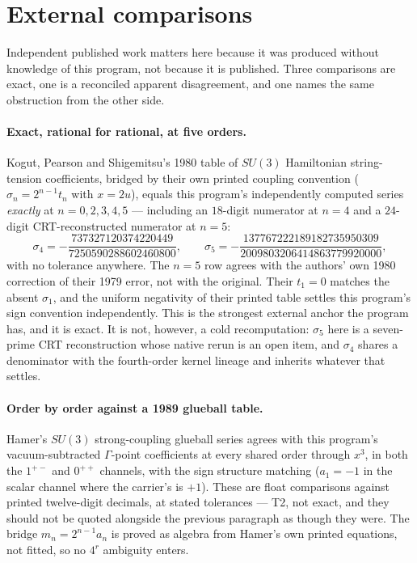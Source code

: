 \documentclass[11pt]{article}
\theoremstyle{definition}
\theoremstyle{remark}
\newcommand{\chk}[1]{}
\begin{document}
\section{External comparisons}\label{sec:external}

Independent published work matters here because it was produced without
knowledge of this program, not because it is published. Three comparisons are
exact, one is a reconciled apparent disagreement, and one names the same
obstruction from the other side.

\paragraph{Exact, rational for rational, at five orders.} Kogut, Pearson and
Shigemitsu's 1980 table of $SU(3)$ Hamiltonian string-tension coefficients,
bridged by their own printed coupling convention ($\sigma_n=2^{n-1}t_n$ with
$x=2u$), equals this program's independently computed series \emph{exactly} at
$n=0,2,3,4,5$ --- including an $18$-digit numerator at $n=4$ and a $24$-digit
CRT-reconstructed numerator at $n=5$:
\[
  \sigma_4=-\frac{737327120374220449}{7250590288602460800},\qquad
  \sigma_5=-\frac{137767222189182735950309}{2009803206414863779920000},
\]
with no tolerance anywhere. The $n=5$ row agrees with the authors' own 1980
correction of their 1979 error, not with the original. Their $t_1=0$ matches
the absent $\sigma_1$, and the uniform negativity of their printed table
settles this program's sign convention independently. This is the strongest
external anchor the program has, and it is exact. It is not, however, a cold
recomputation: $\sigma_5$ here is a seven-prime CRT reconstruction whose native
rerun is an open item, and $\sigma_4$ shares a denominator with the
fourth-order kernel lineage and inherits whatever that
settles.\chk{the KPS 1980 string-tension table equals the certified sigma series EXACTLY}

\paragraph{Order by order against a 1989 glueball table.} Hamer's $SU(3)$
strong-coupling glueball series agrees with this program's vacuum-subtracted
$\Gamma$-point coefficients at every shared order through $x^3$, in both the
$1^{+-}$ and $0^{++}$ channels, with the sign structure matching ($a_1=-1$ in
the scalar channel where the carrier's is $+1$). These are float comparisons
against printed twelve-digit decimals, at stated tolerances --- T2, not exact,
and they should not be quoted alongside the previous paragraph as though they
were. The bridge $m_n=2^{n-1}a_n$ is proved as algebra from Hamer's own printed
equations, not fitted, so no $4^r$ ambiguity enters.\chk{the m\_n = 2\^{}(n-1) a\_n bridge is the x = 2u conversion}
\end{document}
